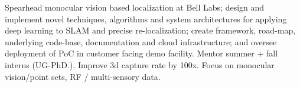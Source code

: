 \documentclass[]{deedy-resume-openfont}
\begin{document}
\begin{minipage}[t]{0.58\textwidth} 




 \newline




Spearhead monocular vision based localization at Bell Labs; design and implement novel techniques, algorithms and  system architectures for applying deep learning to SLAM and precise re-localization; create framework, road-map, underlying code-base, documentation and cloud infrastructure; and oversee deployment of PoC in customer facing demo facility. Mentor summer + fall interns (UG-PhD.). Improve 3d capture rate by 100x. Focus on monocular vision/point sets,  RF / multi-sensory data. 


\sectionseplg





\end{minipage}
\end{document}
